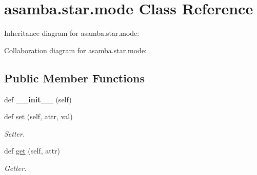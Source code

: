 \hypertarget{classasamba_1_1star_1_1mode}{}\section{asamba.\+star.\+mode Class Reference}
\label{classasamba_1_1star_1_1mode}


Inheritance diagram for asamba.\+star.\+mode\+:


Collaboration diagram for asamba.\+star.\+mode\+:
\subsection*{Public Member Functions}
\begin{DoxyCompactItemize}
\item 
\mbox{\label{classasamba_1_1star_1_1mode_ac9526f60e2052a0f0fc55138a76217fc}} 
def {\bfseries \+\_\+\+\_\+init\+\_\+\+\_\+} (self)
\item 
\mbox{\label{classasamba_1_1star_1_1mode_acd7157d9ec303f09579e24ba7d2638cc}} 
def \hyperlink{classasamba_1_1star_1_1mode_acd7157d9ec303f09579e24ba7d2638cc}{set} (self, attr, val)
\begin{DoxyCompactList}\small\item\em Setter. \end{DoxyCompactList}\item 
\mbox{\label{classasamba_1_1star_1_1mode_a88d1239ec655f2bc03e5db88e170aad0}} 
def \hyperlink{classasamba_1_1star_1_1mode_a88d1239ec655f2bc03e5db88e170aad0}{get} (self, attr)
\begin{DoxyCompactList}\small\item\em Getter. \end{DoxyCompactList}\end{DoxyCompactItemize}
